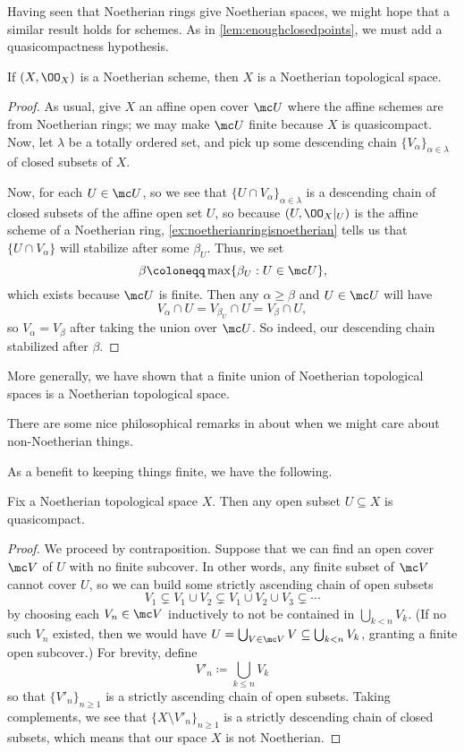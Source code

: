 \documentclass[../notes.tex]{subfiles}
\begin{document}
Having seen that Noetherian rings give Noetherian spaces, we might hope that a similar result holds for schemes. As in \autoref{lem:enoughclosedpoints}, we must add a quasicompactness hypothesis.
\begin{lemma} \label{lem:noetherianspace}
	If $(X,\OO_X)$ is a Noetherian scheme, then $X$ is a Noetherian topological space.
\end{lemma}
\begin{proof}
	As usual, give $X$ an affine open cover $\mc U$ where the affine schemes are from Noetherian rings; we may make $\mc U$ finite because $X$ is quasicompact. Now, let $\lambda$ be a totally ordered set, and pick up some descending chain $\{V_\alpha\}_{\alpha\in\lambda}$ of closed subsets of $X$.

	Now, for each $U\in\mc U$, so we see that $\{U\cap V_\alpha\}_{\alpha\in\lambda}$ is a descending chain of closed subsets of the affine open set $U$, so because $(U,\OO_X|_U)$ is the affine scheme of a Noetherian ring, \autoref{ex:noetherianringisnoetherian} tells us that $\{U\cap V_\alpha\}$ will stabilize after some $\beta_U$. Thus, we set
	\[\beta\coloneqq\max\{\beta_U:U\in\mc U\},\]
	which exists because $\mc U$ is finite. Then any $\alpha\ge\beta$ and $U\in\mc U$ will have
	\[V_\alpha\cap U=V_{\beta_U}\cap U=V_\beta\cap U,\]
	so $V_\alpha=V_\beta$ after taking the union over $\mc U$. So indeed, our descending chain stabilized after $\beta$.
\end{proof}
\begin{remark}
	More generally, we have shown that a finite union of Noetherian topological spaces is a Noetherian topological space.
\end{remark}
\begin{remark}
	There are some nice philosophical remarks in \cite[Section~3.6.21]{rising-sea} about when we might care about non-Noetherian things.
\end{remark}
As a benefit to keeping things finite, we have the following.
\begin{lemma} \label{lem:opensarecompact}
	Fix a Noetherian topological space $X$. Then any open subset $U\subseteq X$ is quasicompact.
\end{lemma}
\begin{proof}
	We proceed by contraposition. Suppose that we can find an open cover $\mc V$ of $U$ with no finite subcover. In other words, any finite subset of $\mc V$ cannot cover $U$, so we can build some strictly ascending chain of open subsets
	\[V_1\subsetneq V_1\cup V_2\subsetneq V_1\cup V_2\cup V_3\subsetneq\cdots\]
	by choosing each $V_n\in\mc V$ inductively to not be contained in $\bigcup_{k<n}V_k$. (If no such $V_n$ existed, then we would have $U=\bigcup_{V\in\mc V}V\subseteq\bigcup_{k<n}V_k$, granting a finite open subcover.) For brevity, define
	\[V'_n\coloneqq\bigcup_{k\le n}V_k\]
	so that $\{V'_n\}_{n\ge1}$ is a strictly ascending chain of open subsets. Taking complements, we see that $\{X\setminus V'_n\}_{n\ge1}$ is a strictly descending chain of closed subsets, which means that our space $X$ is not Noetherian.
\end{proof}
\end{document}
